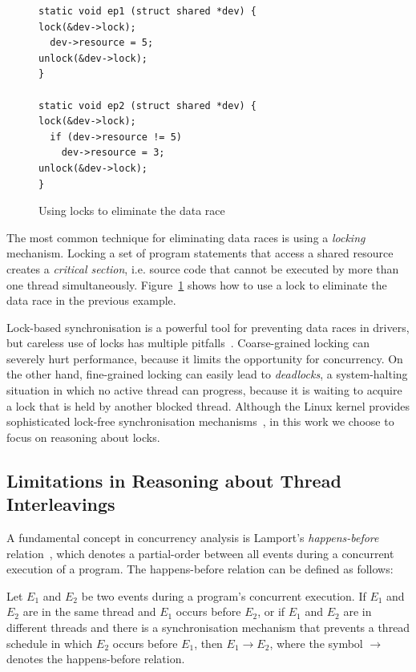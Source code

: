 \begin{figure}[!h]
\centering
\noindent\begin{minipage}{.95\textwidth}
\begin{lstlisting}
static void ep1 (struct shared *dev) {
lock(&dev->lock);
  dev->resource = 5;
unlock(&dev->lock);
}

static void ep2 (struct shared *dev) {
lock(&dev->lock);
  if (dev->resource != 5)
    dev->resource = 3;
unlock(&dev->lock);
}
\end{lstlisting}
\end{minipage}
\caption{Using locks to eliminate the data race}
\label{lock_example}
\end{figure}

The most common technique for eliminating data races is using a \emph{locking} mechanism. Locking a set of program statements that access a shared resource creates a \emph{critical section}, i.e. source code that cannot be executed by more than one thread simultaneously. Figure~\ref{lock_example} shows how to use a lock to eliminate the data race in the previous example.

Lock-based synchronisation is a powerful tool for preventing data races in drivers, but careless use of locks has multiple pitfalls~\cite{sutter2005software}. Coarse-grained locking can severely hurt performance, because it limits the opportunity for concurrency. On the other hand, fine-grained locking can easily lead to \emph{deadlocks}, a system-halting situation in which no active thread can progress, because it is waiting to acquire a lock that is held by another blocked thread. Although the Linux kernel provides sophisticated lock-free synchronisation mechanisms~\cite{corbet2005linux}, in this work we choose to focus on reasoning about locks.

\subsection{Limitations in Reasoning about Thread Interleavings}

A fundamental concept in concurrency analysis is Lamport's \emph{happens-before} relation~\cite{lamport1978time}, which denotes a partial-order between all events during a concurrent execution of a program. The happens-before relation can be defined as follows:

\begin{definition}
\label{definition:datarace}
Let $E_1$ and $E_2$ be two events during a program's concurrent execution. If $E_1$ and $E_2$ are in the same thread and $E_1$ occurs before $E_2$, or if $E_1$ and $E_2$ are in different threads and there is a synchronisation mechanism that prevents a thread schedule in which $E_2$ occurs before $E_1$, then $E_1 \rightarrow E_2$, where the symbol $\rightarrow$ denotes the happens-before relation.
\end{definition}

